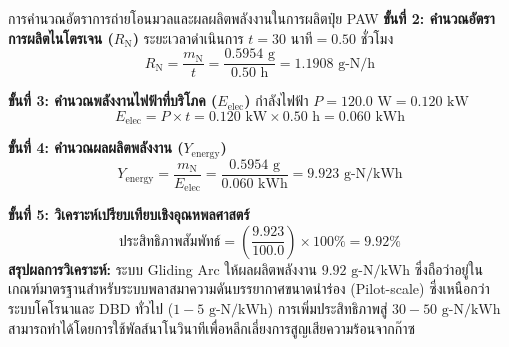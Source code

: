 \begin{examplebox}{การคำนวณอัตราการถ่ายโอนมวลและผลผลิตพลังงานในการผลิตปุ๋ย PAW}
\textbf{ขั้นที่ 2: คำนวณอัตราการผลิตไนโตรเจน ($R_{\text{N}}$)}
ระยะเวลาดำเนินการ $t = 30 \text{ นาที} = 0.50 \text{ ชั่วโมง}$
\begin{equation*}
    R_{\text{N}} = \frac{m_{\text{N}}}{t} = \frac{0.5954 \text{ g}}{0.50 \text{ h}} = 1.1908 \text{ g-N/h}
\end{equation*}

\textbf{ขั้นที่ 3: คำนวณพลังงานไฟฟ้าที่บริโภค ($E_{\text{elec}}$)}
กำลังไฟฟ้า $P = 120.0 \text{ W} = 0.120 \text{ kW}$
\begin{equation*}
    E_{\text{elec}} = P \times t = 0.120 \text{ kW} \times 0.50 \text{ h} = 0.060 \text{ kWh}
\end{equation*}

\textbf{ขั้นที่ 4: คำนวณผลผลิตพลังงาน ($Y_{\text{energy}}$)}
\begin{equation*}
    Y_{\text{energy}} = \frac{m_{\text{N}}}{E_{\text{elec}}} = \frac{0.5954 \text{ g}}{0.060 \text{ kWh}} = 9.923 \text{ g-N/kWh}
\end{equation*}

\textbf{ขั้นที่ 5: วิเคราะห์เปรียบเทียบเชิงอุณหพลศาสตร์}
\begin{equation*}
    \text{ประสิทธิภาพสัมพัทธ์} = \left( \frac{9.923}{100.0} \right) \times 100\% = 9.92\%
\end{equation*}
\textbf{สรุปผลการวิเคราะห์:} ระบบ Gliding Arc ให้ผลผลิตพลังงาน $9.92 \text{ g-N/kWh}$ ซึ่งถือว่าอยู่ในเกณฑ์มาตรฐานสำหรับระบบพลาสมาความดันบรรยากาศขนาดนำร่อง (Pilot-scale) ซึ่งเหนือกว่าระบบโคโรนาและ DBD ทั่วไป ($1 - 5 \text{ g-N/kWh}$) การเพิ่มประสิทธิภาพสู่ $30 - 50 \text{ g-N/kWh}$ สามารถทำได้โดยการใช้พัลส์นาโนวินาทีเพื่อหลีกเลี่ยงการสูญเสียความร้อนจากก๊าซ
\end{examplebox}

